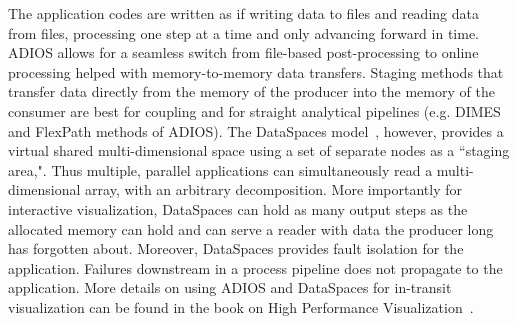 The application codes are written as if writing data to files and reading data from files, processing one step at a time and only advancing forward in time. ADIOS allows for a seamless switch from file-based post-processing to online processing helped with memory-to-memory data transfers. Staging methods that transfer data directly from the memory of the producer into the memory of the consumer are best for coupling and for straight analytical pipelines (e.g. DIMES and FlexPath methods of ADIOS). The DataSpaces model~\cite{ADIOS:Docan:cluster12}, however, provides a virtual shared multi-dimensional space using a set of separate nodes as a ``staging area,". Thus multiple, parallel applications can simultaneously read a multi-dimensional array, with an arbitrary decomposition. More importantly for interactive visualization, DataSpaces can hold as many output steps as the allocated memory can hold and can serve a reader with data the producer long has forgotten about. Moreover, DataSpaces provides fault isolation for the application. Failures downstream in a process pipeline does not propagate to the application. More details on using ADIOS and DataSpaces for in-transit visualization can be found in the book on High Performance Visualization~\cite{ADIOS:Bethel-Childs-Hansen:HPV:2012}.
